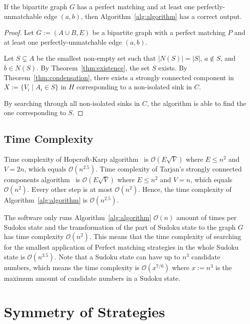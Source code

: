 \begin{thm}
    If the bipartite graph $G$ has a perfect matching and at least one perfectly-unmatchable edge $(a, b)$,
    then Algorithm~\ref{alg:algorithm} has a correct output.
\end{thm}

\begin{proof}
    Let $G := (A \cup B, E)$ be a bipartite graph with a perfect matching $P$
    and at least one perfectly-unmatchable edge $(a, b)$.

    Let $S \subsetneq A$ be the smallest non-empty set such that
    $\left|N(S)\right| = \left|S\right|$, $a \notin S$, and $b \in N(S)$.
    By Theorem~\ref{thm:existence}, the set $S$ exists.
    By Theorem~\ref{thm:condensation},
    there exists a strongly connected component in $X := \{V_i \mid A_i \in S\}$ in $H$
    corresponding to a non-isolated sink in $C$.

    By searching through all non-isolated sinks in $C$, the algorithm is able to find the one corresponding to $S$.
\end{proof}

\subsection*{Time Complexity}

Time complexity of Hopcroft-Karp algorithm~\cite{hopcroft1973} is $\mathcal{O}(E\sqrt{V})$
where $E \leq n^2$ and $V = 2n$, which equals $\mathcal{O}(n^{2.5})$.
Time complexity of Tarjan's strongly connected components algorithm~\cite{tarjan1972} is $\mathcal{O}(E\sqrt{V})$
where $E \leq n^2$ and $V = n$, which equals $\mathcal{O}(n^2)$.
Every other step is at most $\mathcal{O}(n^2)$.
Hence, the time complexity of Algorithm~\ref{alg:algorithm} is $\mathcal{O}(n^{2.5})$.

The software only runs Algorithm~\ref{alg:algorithm} $\mathcal{O}(n)$ amount of times per Sudoku state
and the transformation of the part of Sudoku state to the graph $G$ has time complexity $\mathcal{O}(n^2)$.
This means that the time complexity of searching for the smallest application of Perfect matching strategies
in the whole Sudoku state is $\mathcal{O}(n^{3.5})$.
Note that a Sudoku state can have up to $n^3$ candidate numbers,
which means the time complexity is $\mathcal{O}(x^{7/6})$ where $x := n^3$
is the maximum amount of candidate numbers in a Sudoku state.

\section{Symmetry of Strategies}

